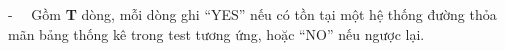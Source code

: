 -   Gồm \textbf{ T } dòng, mỗi dòng ghi “YES” nếu có tồn tại một hệ thống đường thỏa mãn bảng thống kê trong test tương ứng, hoặc “NO” nếu ngược lại.